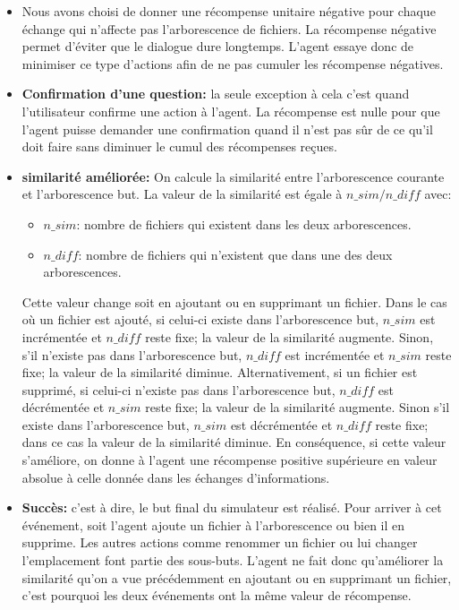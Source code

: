 \begin{itemize}
	\item Nous avons choisi de donner une récompense unitaire négative pour chaque échange qui n'affecte pas l'arborescence de fichiers. La récompense négative permet d'éviter que le dialogue dure longtemps. L'agent essaye donc de minimiser ce type d'actions afin de ne pas cumuler les récompense négatives.
	\item \textbf{Confirmation d'une question:} la seule exception à cela c'est quand l'utilisateur confirme une action à l'agent. La récompense est nulle pour que l'agent puisse demander une confirmation quand il n'est pas sûr de ce qu'il doit faire sans diminuer le cumul des récompenses reçues.
	\item \textbf{similarité améliorée:} On calcule la similarité entre l'arborescence courante et l'arborescence but. La valeur de la similarité est égale à $n\_sim/n\_diff$ avec: 
	\begin{itemize}
		\item $n\_sim$: nombre de fichiers qui existent dans les deux arborescences.
		\item $n\_diff$: nombre de fichiers qui n'existent que dans une des deux arborescences.  
	\end{itemize}
	Cette valeur change soit en ajoutant ou en supprimant un fichier. Dans le cas où un fichier est ajouté, si celui-ci existe dans l'arborescence but, $n\_sim$ est incrémentée et $n\_diff$ reste fixe; la valeur de la similarité augmente. Sinon, s'il n'existe pas dans l'arborescence but, $n\_diff$ est incrémentée et $n\_sim$ reste fixe; la valeur de la similarité diminue. Alternativement, si un fichier est supprimé, si celui-ci n'existe pas dans l'arborescence but, $n\_diff$ est décrémentée et $n\_sim$ reste fixe; la valeur de la similarité augmente. Sinon s'il existe dans l'arborescence but, $n\_sim$ est décrémentée et $n\_diff$ reste fixe; dans ce cas la valeur de la similarité diminue.
	En conséquence, si cette valeur s'améliore, on donne à l'agent une récompense positive supérieure en valeur absolue à celle donnée dans les échanges d'informations.
	\item \textbf{Succès:} c'est à dire, le but final du simulateur est réalisé. Pour arriver à cet événement, soit l'agent ajoute un fichier à l'arborescence ou bien il en supprime. Les autres actions comme renommer un fichier ou lui changer l'emplacement font partie des sous-buts. L'agent ne fait donc qu'améliorer la similarité qu'on a vue précédemment en ajoutant ou en supprimant un fichier, c'est pourquoi les deux événements ont la même valeur de récompense.

\end{itemize}
